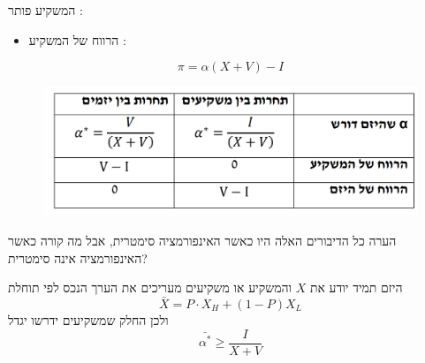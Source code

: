 \documentclass[usenames,dvipsnames]{beamer}
\begin{document}
\begin{RTL}
\begin{frame}[allowframebreaks]
    המשקיע פותר : \\
    \begin{itemize}
        \item  הרווח של המשקיע :
    \end{itemize}
    $$\pi = \alpha(X+V) - I$$
    \begin{figure}
        \centering
        \includegraphics[width=\textwidth]{images/Screenshot 2023-12-03 at 19.35.55.png}
    \end{figure}

    \framebreak
    \begin{alertblock}{הערה}
    כל הדיבורים האלה היו כאשר האינפורמציה סימטרית, אבל מה קורה כאשר האינפורמציה אינה סימטרית?
        
    \end{alertblock}
   היזם תמיד יודע את $X$ והמשקיע או משקיעים מעריכים את הערך הנכס לפי תוחלת
   $$\bar{X} = P \cdot X_H + \left(1-P\right) X_L $$
   ולכן החלק שמשקיעים ידרשו יגדל
    $$\bar{\alpha^*} \geq \frac{I}{X+V}$$

\end{frame}
\end{RTL}
\end{document}
